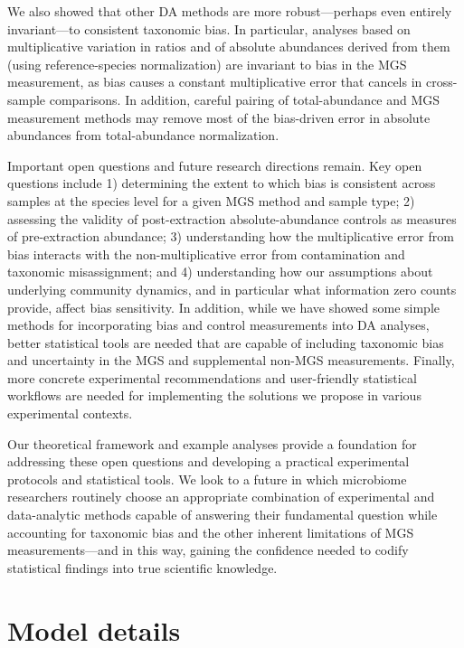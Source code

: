 \documentclass[
]{article}
\begin{document}
We also showed that other DA methods are more robust---perhaps even entirely invariant---to consistent taxonomic bias.
In particular, analyses based on multiplicative variation in ratios and of absolute abundances derived from them (using reference-species normalization) are invariant to bias in the MGS measurement, as bias causes a constant multiplicative error that cancels in cross-sample comparisons.
In addition, careful pairing of total-abundance and MGS measurement methods may remove most of the bias-driven error in absolute abundances from total-abundance normalization.

Important open questions and future research directions remain.
Key open questions include 1) determining the extent to which bias is consistent across samples at the species level for a given MGS method and sample type; 2) assessing the validity of post-extraction absolute-abundance controls as measures of pre-extraction abundance; 3) understanding how the multiplicative error from bias interacts with the non-multiplicative error from contamination and taxonomic misassignment; and 4) understanding how our assumptions about underlying community dynamics, and in particular what information zero counts provide, affect bias sensitivity.
In addition, while we have showed some simple methods for incorporating bias and control measurements into DA analyses, better statistical tools are needed that are capable of including taxonomic bias and uncertainty in the MGS and supplemental non-MGS measurements.
Finally, more concrete experimental recommendations and user-friendly statistical workflows are needed for implementing the solutions we propose in various experimental contexts.

Our theoretical framework and example analyses provide a foundation for addressing these open questions and developing a practical experimental protocols and statistical tools.
We look to a future in which microbiome researchers routinely choose an appropriate combination of experimental and data-analytic methods capable of answering their fundamental question while accounting for taxonomic bias and the other inherent limitations of MGS measurements---and in this way, gaining the confidence needed to codify statistical findings into true scientific knowledge.

\hypertarget{appendix-appendix}{%
\appendix {}}


\hypertarget{model-details}{%
\section{Model details}\label{model-details}}
\end{document}
